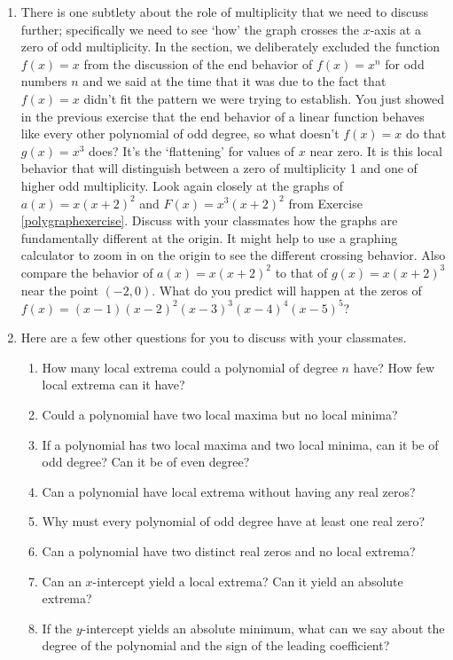 \begin{enumerate}
\item {} There is one subtlety about the role of multiplicity that we need to discuss further; specifically we need to see `how' the graph crosses the $x$-axis at a zero of odd multiplicity.  In the section, we deliberately excluded the function $f(x) = x$ from the discussion of the end behavior of $f(x) = x^{n}$ for odd numbers $n$ and we said at the time that it was due to the fact that $f(x) = x$ didn't fit the pattern we were trying to establish.  You just showed in the previous exercise that the end behavior of a linear function behaves like every other polynomial of odd degree, so what doesn't $f(x) = x$ do that $g(x) = x^{3}$ does?  It's the `flattening' for values of $x$ near zero.  It is this local behavior that will distinguish between a zero of multiplicity 1 and one of higher odd multiplicity.  Look again closely at the graphs of $a(x) = x(x + 2)^{2}$ and $F(x) = x^{3}(x + 2)^{2}$ from Exercise \ref{polygraphexercise}.  Discuss with your classmates how the graphs are fundamentally different at the origin.  It might help to use a graphing calculator to zoom in on the origin to see the different crossing behavior. Also compare the behavior of $a(x) = x(x + 2)^{2}$ to that of $g(x) = x(x + 2)^{3}$ near the point $(-2, 0)$.  What do you predict will happen at the zeros of $f(x) = (x - 1)(x - 2)^2(x - 3)^{3}(x - 4)^{4}(x - 5)^{5}$?

\item Here are a few other questions for you to discuss with your classmates.  

\begin{enumerate}

\item How many local extrema could a polynomial of degree $n$ have?  How few local extrema can it have?
\item Could a polynomial have two local maxima but no local minima?  
\item If a polynomial has two local maxima and two local minima, can it be of odd degree?  Can it be of even degree?
\item Can a polynomial have local extrema without having any real zeros?
\item Why must every polynomial of odd degree have at least one real zero?
\item Can a polynomial have two distinct real zeros and no local extrema?
\item Can an $x$-intercept yield a local extrema?  Can it yield an absolute extrema?
\item If the $y$-intercept yields an absolute minimum, what can we say about the degree of the polynomial and the sign of the leading coefficient?   

\end{enumerate}

\setcounter{HW}{\value{enumi}}
\end{enumerate}
\newpage

